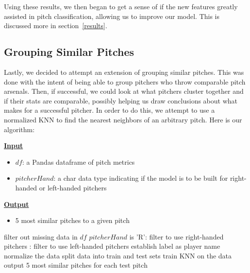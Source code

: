 \documentclass{article}
\begin{document}
Using these results, we then began to get a sense of if the new features greatly assisted 
in pitch classification, allowing us to improve our model. This is discussed more in 
section~\ref{results}.

\subsection{Grouping Similar Pitches}
\label{pitchsim}

Lastly, we decided to attempt an extension of grouping similar pitches. This was done with the 
intent of being able to group pitchers who throw comparable pitch arsenals. Then, if successful, 
we could look at what pitchers cluster together and if their stats are comparable, possibly 
helping us draw conclusions about what makes for a successful pitcher. In order to do 
this, we attempt to use a normalized KNN to find the nearest neighbors of an arbitrary 
pitch. Here is our algorithm:

\textbf{\underline{Input}}
\begin{itemize}[noitemsep]
  \vspace{-.1in}
  \item $df$: a Pandas dataframe of pitch metrics
  \item $pitcherHand$: a char data type indicating if the model is to be built for right-handed 
  or left-handed pitchers
\end{itemize}

\vspace{-.15in}

\textbf{\underline{Output}}
\begin{itemize}[noitemsep]
  \vspace{-.1in}
  \item 5 most similar pitches to a given pitch
\end{itemize}

\vspace{-.25in}

\begin{codebox}
  \li filter out missing data in $df$
  \li \If $pitcherHand$ is 'R': \Then
  \li filter to use right-handed pitchers
  \End
  \li \Else: \Then
  \li filter to use left-handed pitchers
  \End
  \li establish label as player name
  \li normalize the data
  \li split data into train and test sets
  \li train KNN on the data
  \li output 5 most similar pitches for each test pitch
\end{codebox}
\end{document}
